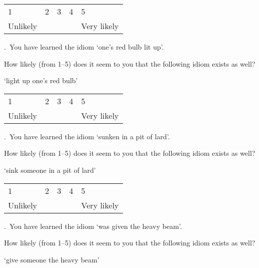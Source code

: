 \documentclass[output=paper]{langsci/langscibook}
\begin{document}
\noindent \begin{tabularx}{\textwidth}{XXXXX}
        1 & 2 & 3 & 4 & 5\\
        Unlikely & & & & Very likely\\
        \end{tabularx}\vspace{1\baselineskip}

.\ You have learned the idiom \enquote*{{one's red bulb lit up}}.


\noindent How likely (from 1--5) does it seem to you that the following idiom exists
    as well?\vspace{.5\baselineskip}

\noindent \enquote*{{light up one's red bulb}}\vspace{.5\baselineskip}

\noindent \begin{tabularx}{\textwidth}{XXXXX}
        1 & 2 & 3 & 4 & 5\\
        Unlikely & & & & Very likely\\
        \end{tabularx}\vspace{1\baselineskip}

.\ You have learned the idiom \enquote*{{sunken in a pit of lard}}.

\noindent How likely (from 1--5) does it seem to you that the following idiom exists
    as well?\vspace{.5\baselineskip}

\noindent \enquote*{{sink someone in a pit of lard}}\vspace{.5\baselineskip}

\noindent \begin{tabularx}{\textwidth}{XXXXX}
        1 & 2 & 3 & 4 & 5\\
        Unlikely & & & & Very likely\\
        \end{tabularx}\vspace{1\baselineskip}

.\ You have learned the idiom \enquote*{{was given the heavy beam}}.

\noindent How likely (from 1--5) does it seem to you that the following idiom exists
    as well?\vspace{.5\baselineskip}

\noindent \enquote*{{give someone the heavy beam}}\vspace{.5\baselineskip}
\end{document}
